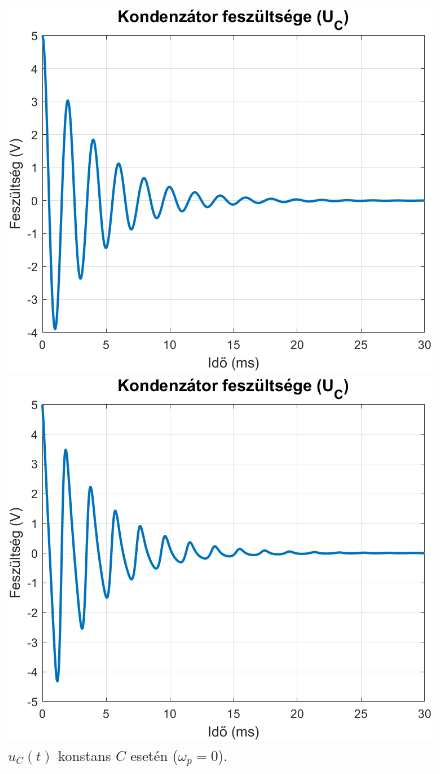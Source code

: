 \documentclass[12pt,a4paper]{article}
\begin{document}
\begin{figure}[H]
    \centering
    \begin{minipage}{0.5\textwidth}
        \centering
        \includegraphics[width=\textwidth]{figures/0.png}
        \caption{$u_C(t)$ konstans $C$ esetén ($\omega_p = 0$).}
        \label{fig:constC}
    \end{minipage}%
    \begin{minipage}{0.5\textwidth}
        \centering
        \includegraphics[width=\textwidth]{figures/1.png}

\end{minipage}
\end{figure}
\end{document}
